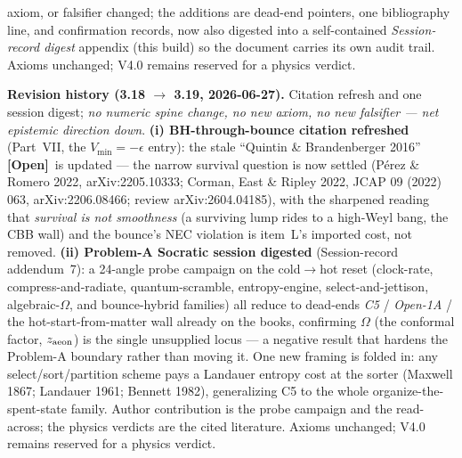 \documentclass[11pt]{article}
\newcommand{\open}{\textcolor{red!70!black}{\textbf{[Open]}}}
\begin{document}
{axiom, or falsifier changed; the additions are dead-end pointers, one bibliography line, and confirmation records, now also digested into a self-contained \emph{Session-record digest} appendix (this build) so the document carries its own audit trail. Axioms unchanged; V4.0 remains reserved for a physics verdict.

\smallskip\noindent\textbf{Revision history (3.18 $\to$ 3.19, 2026-06-27).} Citation refresh and one session digest; \emph{no numeric spine change, no new axiom, no new falsifier --- net epistemic direction down}. \textbf{(i) BH-through-bounce citation refreshed} (Part~VII, the $V_{\min}=-\epsilon$ entry): the stale ``Quintin \& Brandenberger 2016'' \open\ is updated --- the narrow survival question is now settled (P\'erez \& Romero 2022, arXiv:2205.10333; Corman, East \& Ripley 2022, JCAP 09 (2022) 063, arXiv:2206.08466; review arXiv:2604.04185), with the sharpened reading that \emph{survival is not smoothness} (a surviving lump rides to a high-Weyl bang, the CBB wall) and the bounce's NEC violation is item~L's imported cost, not removed. \textbf{(ii) Problem-A Socratic session digested} (Session-record addendum~7): a 24-angle probe campaign on the cold$\to$hot reset (clock-rate, compress-and-radiate, quantum-scramble, entropy-engine, select-and-jettison, algebraic-$\Omega$, and bounce-hybrid families) all reduce to dead-ends \emph{C5} / \emph{Open-1A} / the hot-start-from-matter wall already on the books, confirming $\Omega$ (the conformal factor, $z_{\rm aeon}$) is the single unsupplied locus --- a negative result that hardens the Problem-A boundary rather than moving it. One new framing is folded in: any select/sort/partition scheme pays a Landauer entropy cost at the sorter (Maxwell 1867; Landauer 1961; Bennett 1982), generalizing C5 to the whole organize-the-spent-state family. Author contribution is the probe campaign and the read-across; the physics verdicts are the cited literature. Axioms unchanged; V4.0 remains reserved for a physics verdict.

}
\end{document}
